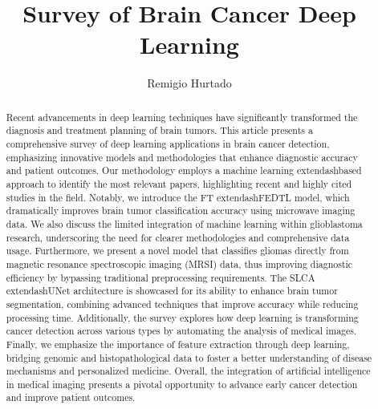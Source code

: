 \documentclass[runningheads]{llncs}
\begin{document}
%
\title{Survey of Brain Cancer Deep Learning}
%
%
\author{Remigio Hurtado}
%
%
%
\maketitle    
%
\begin{abstract}
Recent advancements in deep learning techniques have significantly transformed the diagnosis and treatment planning of brain tumors. This article presents a comprehensive survey of deep learning applications in brain cancer detection, emphasizing innovative models and methodologies that enhance diagnostic accuracy and patient outcomes. Our methodology employs a machine learning	extendash{}based approach to identify the most relevant papers, highlighting recent and highly cited studies in the field. Notably, we introduce the FT	extendash{}FEDTL model, which dramatically improves brain tumor classification accuracy using microwave imaging data. We also discuss the limited integration of machine learning within glioblastoma research, underscoring the need for clearer methodologies and comprehensive data usage. Furthermore, we present a novel model that classifies gliomas directly from magnetic resonance spectroscopic imaging (MRSI) data, thus improving diagnostic efficiency by bypassing traditional preprocessing requirements. The SLCA	extendash{}UNet architecture is showcased for its ability to enhance brain tumor segmentation, combining advanced techniques that improve accuracy while reducing processing time. Additionally, the survey explores how deep learning is transforming cancer detection across various types by automating the analysis of medical images. Finally, we emphasize the importance of feature extraction through deep learning, bridging genomic and histopathological data to foster a better understanding of disease mechanisms and personalized medicine. Overall, the integration of artificial intelligence in medical imaging presents a pivotal opportunity to advance early cancer detection and improve patient outcomes.
\end{abstract}
\end{document}

